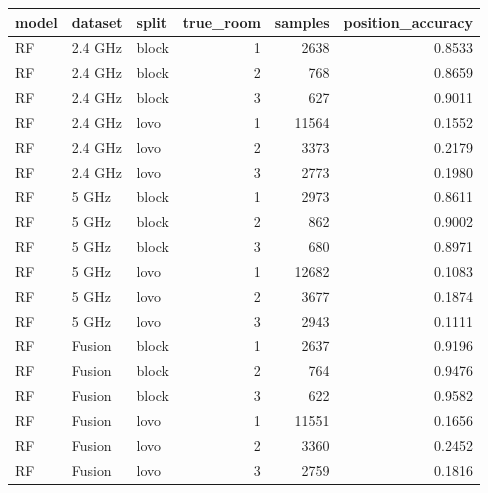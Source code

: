 \begin{tabular}{lllrrr}
\toprule
model & dataset & split & true_room & samples & position_accuracy \\
\midrule
RF & 2.4 GHz & block & 1 & 2638 & 0.8533 \\
RF & 2.4 GHz & block & 2 & 768 & 0.8659 \\
RF & 2.4 GHz & block & 3 & 627 & 0.9011 \\
RF & 2.4 GHz & lovo & 1 & 11564 & 0.1552 \\
RF & 2.4 GHz & lovo & 2 & 3373 & 0.2179 \\
RF & 2.4 GHz & lovo & 3 & 2773 & 0.1980 \\
RF & 5 GHz & block & 1 & 2973 & 0.8611 \\
RF & 5 GHz & block & 2 & 862 & 0.9002 \\
RF & 5 GHz & block & 3 & 680 & 0.8971 \\
RF & 5 GHz & lovo & 1 & 12682 & 0.1083 \\
RF & 5 GHz & lovo & 2 & 3677 & 0.1874 \\
RF & 5 GHz & lovo & 3 & 2943 & 0.1111 \\
RF & Fusion & block & 1 & 2637 & 0.9196 \\
RF & Fusion & block & 2 & 764 & 0.9476 \\
RF & Fusion & block & 3 & 622 & 0.9582 \\
RF & Fusion & lovo & 1 & 11551 & 0.1656 \\
RF & Fusion & lovo & 2 & 3360 & 0.2452 \\
RF & Fusion & lovo & 3 & 2759 & 0.1816 \\
\bottomrule
\end{tabular}
